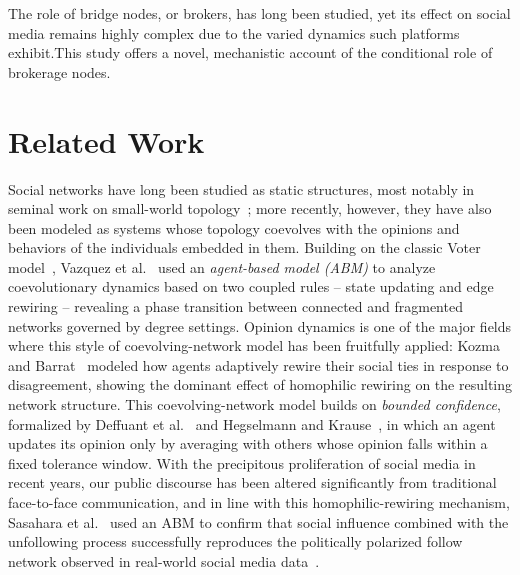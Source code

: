 \documentclass{svproc}
\def\Black{\color[rgb]{0,0,0}}
\begin{document}
%
\Black%
%


The role of bridge nodes, or brokers, has long been studied, yet its
effect on social media remains highly complex due to the varied
dynamics such platforms exhibit.This study offers a novel, mechanistic
account of the conditional role of brokerage nodes.


\section{Related Work}\label{sec:related}
Social networks have long been studied as static structures, most
notably in seminal work on small-world topology~\cite{watts1998};
more recently, however, they have also been modeled as systems whose
topology coevolves with the opinions and behaviors of the individuals
embedded in them.
Building on the classic Voter model~\cite{clifford1973}, Vazquez et
al.~\cite{vazquez2008} used an \emph{agent-based model (ABM)} to analyze
coevolutionary dynamics based on two coupled rules -- state updating
and edge rewiring -- revealing a phase transition between connected
and fragmented networks governed by degree settings.
Opinion dynamics is one of the major fields where this style of
coevolving-network model has been fruitfully applied: Kozma and
Barrat~\cite{kozma2008} modeled how agents adaptively rewire their
social ties in response to disagreement, showing the dominant effect
of homophilic rewiring on the resulting network structure. This
coevolving-network model builds on \emph{bounded confidence},
formalized by Deffuant et al.~\cite{deffuant2000} and Hegselmann and
Krause~\cite{hegselmann2002}, in which an agent updates its opinion
only by averaging with others whose opinion falls within a fixed
tolerance window.
With the precipitous proliferation of social media in recent years,
our public discourse has been altered significantly from traditional
face-to-face communication, and in line with this homophilic-rewiring
mechanism, Sasahara et al.~\cite{sasahara2020} used an ABM to
confirm that social influence combined with the unfollowing
process successfully reproduces the politically polarized follow
network observed in real-world social media data~\cite{conover2011}.
\end{document}
